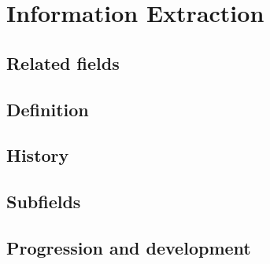 \section{Information Extraction}
\label{sec:information-extraction}


\subsection{Related fields}

\subsection{Definition}

\subsection{History}

\subsection{Subfields}

\subsection{Progression and development}
